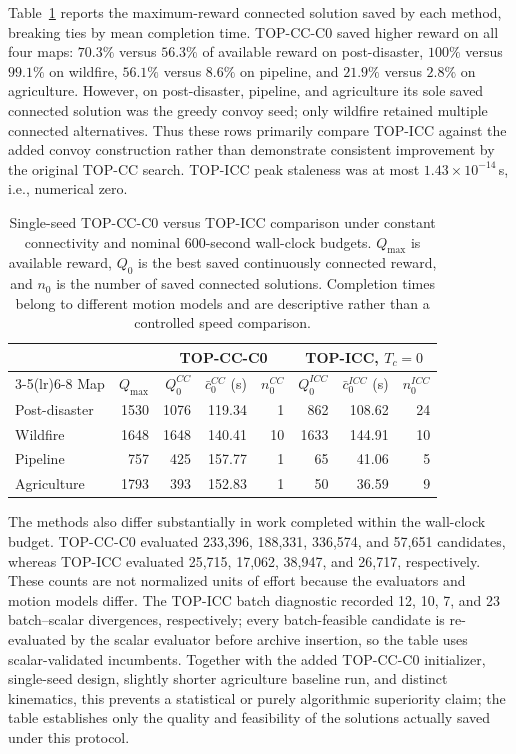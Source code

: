 Table~\ref{tab:topcc_comparison} reports the maximum-reward connected solution saved by each method, breaking ties by mean completion time. TOP-CC-C0 saved higher reward on all four maps: $70.3\%$ versus $56.3\%$ of available reward on post-disaster, $100\%$ versus $99.1\%$ on wildfire, $56.1\%$ versus $8.6\%$ on pipeline, and $21.9\%$ versus $2.8\%$ on agriculture. However, on post-disaster, pipeline, and agriculture its sole saved connected solution was the greedy convoy seed; only wildfire retained multiple connected alternatives. Thus these rows primarily compare TOP-ICC against the added convoy construction rather than demonstrate consistent improvement by the original TOP-CC search. TOP-ICC peak staleness was at most $1.43\times10^{-14}\,$s, i.e., numerical zero.

\begin{table}[t]
\centering
\caption{Single-seed TOP-CC-C0 versus TOP-ICC comparison under constant connectivity and nominal 600-second wall-clock budgets. $Q_{\max}$ is available reward, $Q_0$ is the best saved continuously connected reward, and $n_0$ is the number of saved connected solutions. Completion times belong to different motion models and are descriptive rather than a controlled speed comparison.}
\label{tab:topcc_comparison}
\begin{tabular}{lrrrrrrr}
\toprule
& & \multicolumn{3}{c}{TOP-CC-C0} & \multicolumn{3}{c}{TOP-ICC, $T_c=0$}\\
\cmidrule(lr){3-5}\cmidrule(lr){6-8}
Map & $Q_{\max}$ & $Q_0^{CC}$ & $\bar c_0^{CC}$ (s) & $n_0^{CC}$ & $Q_0^{ICC}$ & $\bar c_0^{ICC}$ (s) & $n_0^{ICC}$\\
\midrule
Post-disaster & 1530 & 1076 & 119.34 & 1 & 862 & 108.62 & 24\\
Wildfire & 1648 & 1648 & 140.41 & 10 & 1633 & 144.91 & 10\\
Pipeline & 757 & 425 & 157.77 & 1 & 65 & 41.06 & 5\\
Agriculture & 1793 & 393 & 152.83 & 1 & 50 & 36.59 & 9\\
\bottomrule
\end{tabular}
\end{table}

The methods also differ substantially in work completed within the wall-clock budget. TOP-CC-C0 evaluated 233,396, 188,331, 336,574, and 57,651 candidates, whereas TOP-ICC evaluated 25,715, 17,062, 38,947, and 26,717, respectively. These counts are not normalized units of effort because the evaluators and motion models differ. The TOP-ICC batch diagnostic recorded 12, 10, 7, and 23 batch--scalar divergences, respectively; every batch-feasible candidate is re-evaluated by the scalar evaluator before archive insertion, so the table uses scalar-validated incumbents. Together with the added TOP-CC-C0 initializer, single-seed design, slightly shorter agriculture baseline run, and distinct kinematics, this prevents a statistical or purely algorithmic superiority claim; the table establishes only the quality and feasibility of the solutions actually saved under this protocol.

